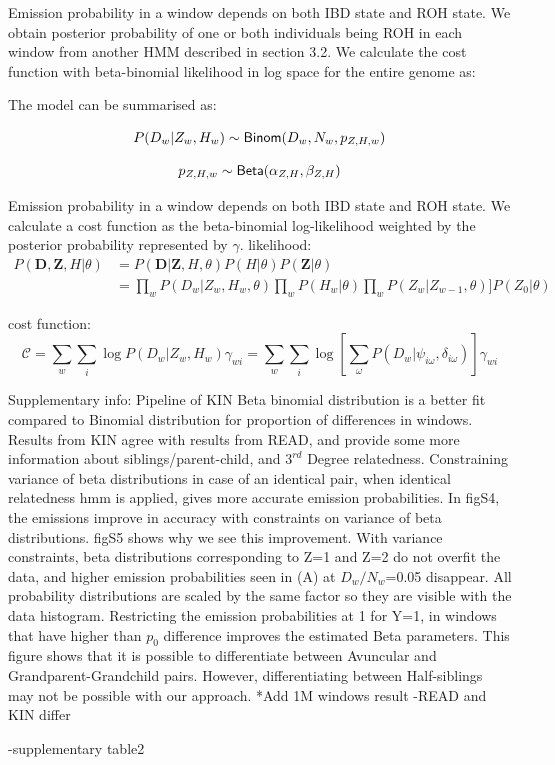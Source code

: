 \documentclass[12pt, letterpaper]{article}
\newcommand{\BZ}{\mathbf{Z}}
\begin{document}
Emission probability in a window depends on both IBD state and ROH state. We obtain posterior probability of one or both individuals being ROH in each window from another HMM described in section 3.2. We calculate the cost function with beta-binomial likelihood in log space for the entire genome as:

The model can be summarised as:

\begin{equation}\label{eq:6}
P(D_w|Z_w,H_w) \sim {\sf Binom}(D_w, N_w, p_{Z,H,w})
\end{equation}

\begin{equation}\label{eq:7}
p_{Z,H,w} \sim {\sf Beta}(\alpha_{Z,H}, \beta_{Z,H})
\end{equation}

Emission probability in a window depends on both IBD state and ROH state. We calculate a cost function as the beta-binomial log-likelihood weighted by the posterior probability represented by $\gamma$.
likelihood:
\begin{align}
P(\mathbf{D},\BZ, H|\theta) &= P(\mathbf{D}|\mathbf{Z},H,\theta) P(H |\theta) P(\BZ|\theta)\nonumber\\
&= \prod_{w}  P(D_w|Z_w,  H_w, \theta) \prod_w P(H_w | \theta) \prod_{w} P(Z_w|Z_{w-1}, \theta)] P(Z_0| \theta) 
\end{align}

cost function:
\begin{equation}
    \mathcal{C} = 
       \sum_{w} \sum_{i} \log P(D_{w}|Z_w, H_w)\gamma_{wi}=
    \sum_{w} \sum_{i} 
    \log \left[\sum_{\omega}P(D_{w}|\psi_{i\omega},\delta_{i\omega}) \right] \gamma_{wi}
\end{equation}

Supplementary info:
Pipeline of KIN
Beta binomial distribution is a better fit compared to Binomial distribution for proportion of differences in windows.
Results from KIN agree with results from READ, and provide some more information about siblings/parent-child, and $3^{rd}$ Degree relatedness. 
Constraining variance of beta distributions in case of an identical pair, when identical relatedness hmm is applied, gives more accurate emission probabilities.
In figS4, the emissions improve in accuracy with constraints on variance of beta distributions. figS5 shows why we see this improvement. With variance constraints, beta distributions corresponding to Z=1 and Z=2 do not overfit the data, and higher emission probabilities seen in (A) at $D_w/N_w$=0.05 disappear. All probability distributions are scaled by the same factor so they are visible with the data histogram.
Restricting the emission probabilities at 1 for Y=1, in windows that have higher than $p_0$ difference improves the estimated Beta parameters. 
This figure shows that it is possible to differentiate between Avuncular and Grandparent-Grandchild pairs.
However, differentiating between Half-siblings may not be possible with our approach. 
*Add 1M windows result
-READ and KIN differ

-supplementary table2
\end{document}
